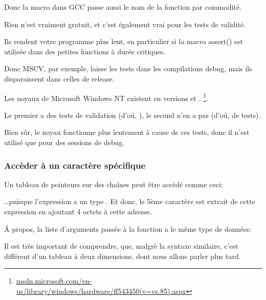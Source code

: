 

Donc la macro dans GCC passe aussi le nom de la fonction par commodité.

Rien n'est vraiment gratuit, et c'est également vrai pour les tests de validité.

Ils rendent votre programme plus lent, en particulier si la macro assert() est utilisée
dans des petites fonctions à durée critiques.

Donc MSCV, par exemple, laisse les tests dans les compilations debug, mais ils disparaissent
dans celles de release.

Les noyaux de Microsoft \gls{Windows NT} existent en versions  et .
\footnote{\href{http://go.yurichev.com/17259}{msdn.microsoft.com/en-us/library/windows/hardware/ff543450(v=vs.85).aspx}}.

Le premier a des tests de validation (d'oú, ), le second n'en a pas (d'oú,  de tests).

Bien sûr, le noyau  fonctionne plus lentement à cause de ces tests, donc
il n'est utilisé que pour des sessions de debug.


\subsubsection{Accèder à un caractère spécifique}

Un tableau de pointeurs sur des chaînes peut être accèdé comme ceci:



\dots puisque l'expression  a un type .
Et donc, le 5ème caractère est extrait de cette expression en ajoutant 4 octets à
cette adresse.

Á propos, la liste d'arguments passée à la fonction  a le même type de
données:



Il est très important de comprendre, que, malgrè la syntaxe similaire, c'est différent
d'un tableau à deux dimensions, dont nous allons parler plus tard.

